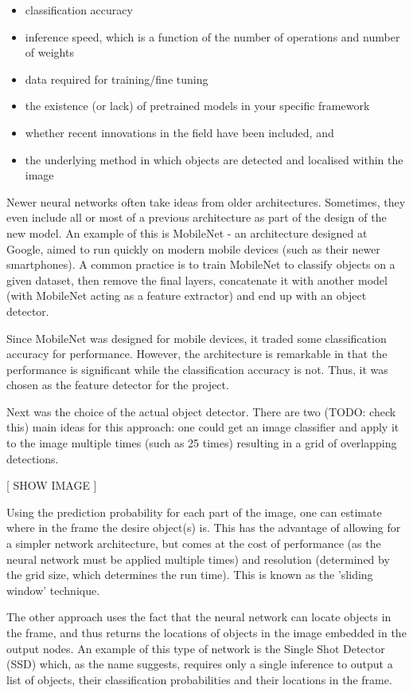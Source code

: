 \begin{itemize}
	\item classification accuracy
	\item inference speed, which is a function of the number of operations and number of weights
	\item data required for training/fine tuning
	\item the existence (or lack) of pretrained models in your specific framework
	\item whether recent innovations in the field have been included, and
	\item the underlying method in which objects are detected and localised within the image
\end{itemize}

Newer neural networks often take ideas from older architectures. Sometimes, they even include all or most of a previous architecture as part of the design of the new model. An example of this is MobileNet - an architecture designed at Google, aimed to run quickly on modern mobile devices (such as their newer smartphones). A common practice is to train MobileNet to classify objects on a given dataset, then remove the final layers, concatenate it with another model (with MobileNet acting as a feature extractor) and end up with an object detector.

Since MobileNet was designed for mobile devices, it traded some classification accuracy for performance. However, the architecture is remarkable in that the performance is significant while the classification accuracy is not. Thus, it was chosen as the feature detector for the project.

Next was the choice of the actual object detector. There are two (TODO: check this) main ideas for this approach: one could get an image classifier and apply it to the image multiple times (such as 25 times) resulting in a grid of overlapping detections.

[ SHOW IMAGE ]

Using the prediction probability for each part of the image, one can estimate where in the frame the desire object(s) is. This has the advantage of allowing for a simpler network architecture, but comes at the cost of performance (as the neural network must be applied multiple times) and resolution (determined by the grid size, which determines the run time). This is known as the 'sliding window' technique.

The other approach uses the fact that the neural network can locate objects in the frame, and thus returns the locations of objects in the image embedded in the output nodes. An example of this type of network is the Single Shot Detector (SSD) which, as the name suggests, requires only a single inference to output a list of objects, their classification probabilities and their locations in the frame.

